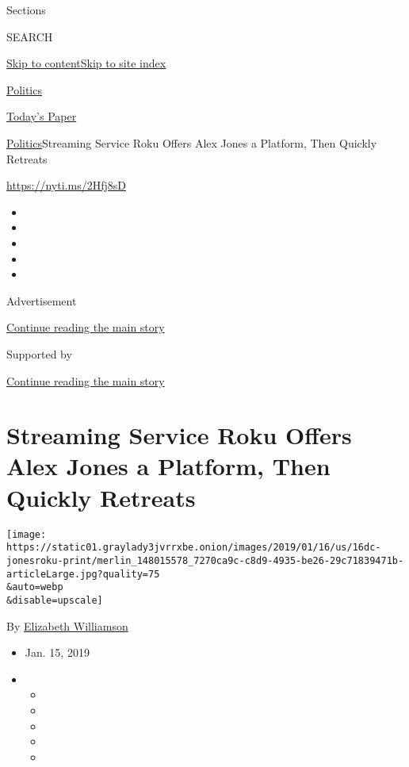 Sections

SEARCH

\protect\hyperlink{site-content}{Skip to
content}\protect\hyperlink{site-index}{Skip to site index}

\href{https://www.nytimes3xbfgragh.onion/section/politics}{Politics}

\href{https://myaccount.nytimes3xbfgragh.onion/auth/login?response_type=cookie\&client_id=vi}{}

\href{https://www.nytimes3xbfgragh.onion/section/todayspaper}{Today's
Paper}

\href{/section/politics}{Politics}\textbar{}Streaming Service Roku
Offers Alex Jones a Platform, Then Quickly Retreats

\url{https://nyti.ms/2Hfj8sD}

\begin{itemize}
\item
\item
\item
\item
\item
\end{itemize}

Advertisement

\protect\hyperlink{after-top}{Continue reading the main story}

Supported by

\protect\hyperlink{after-sponsor}{Continue reading the main story}

\hypertarget{streaming-service-roku-offers-alex-jones-a-platform-then-quickly-retreats}{%
\section{Streaming Service Roku Offers Alex Jones a Platform, Then
Quickly
Retreats}\label{streaming-service-roku-offers-alex-jones-a-platform-then-quickly-retreats}}

\texttt{[image: https://static01.graylady3jvrrxbe.onion/images/2019/01/16/us/16dc-jonesroku-print/merlin\_148015578\_7270ca9c-c8d9-4935-be26-29c71839471b-articleLarge.jpg?quality=75\\\&auto=webp\\\&disable=upscale]}

By
\href{https://www.nytimes3xbfgragh.onion/by/elizabeth-williamson}{Elizabeth
Williamson}

\begin{itemize}
\item
  Jan. 15, 2019
\item
  \begin{itemize}
  \item
  \item
  \item
  \item
  \item
  \end{itemize}
\end{itemize}

